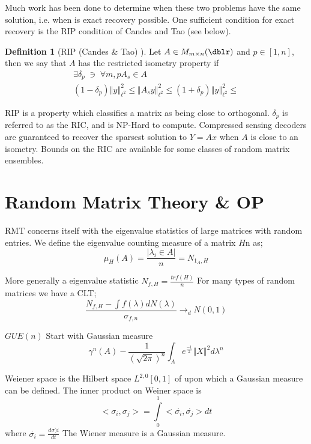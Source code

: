 \documentclass[a4paper]{article}
\newcommand{\norm}[1]{\left\Vert#1\right\Vert}
\theoremstyle{plain}
\theoremstyle{definition}
\newtheorem{defn}{Definition}[section]
\theoremstyle{remark}
\newcommand{\st}{\; \ni \;}
\numberwithin{equation}{section}
\begin{document}
Much work has been done to determine when these two problems have the same solution, i.e. when is exact recovery possible. One  sufficient condition for exact recovery is the RIP condition of Candes and Tao (see below).

\begin{defn}[RIP (Candes \& Tao) ]
Let $A \in M_{m \times n}(\dblr)$ and $p \in [1,n]$, then we say that $A$ has the restricted isometry property if
\begin{eqnarray*}
  \exists \delta_p \st \forall m,p A_s \in A \\
  (1 - \delta_p) \norm{y}_{\ell^2}^2 \leq   \norm{A_s y}_{\ell^2}^2 \leq (1 + \delta_p) \norm{y}_{\ell^2}^2 \leq
\end{eqnarray*}
\end{defn}
RIP is a property which classifies a matrix as being close to orthogonal.  $\delta_p$ is referred to as the RIC, and is NP-Hard to compute.  Compressed sensing decoders are guaranteed to recover the sparsest solution to $Y = A x$ when $A$ is close to an isometry. Bounds on the RIC are available for some classes of random matrix ensembles.


\section{Random Matrix Theory \& OP}

RMT concerns itself with the eigenvalue statistics of large matrices with random entries. We define the eigenvalue counting measure of a matrix $H$n as;
\begin{equation*}
\mu_H (A) = \frac{| \lambda_i \in A |}{n} = N_{1_A, H}
\end{equation*}

More generally a eigenvalue statistic $N_{f,H}  = \frac{tr f(H)}{n}$
For many types of random matrices we have a CLT;
\begin{equation*}
\frac{N_{f,H}-\int f(\lambda) dN(\lambda)}{\sigma_{f,n}} \rightarrow_d N(0,1)
\end{equation*}

$GUE(n)$ Start with Gaussian measure
\begin{equation*}
\gamma^n(A) - \frac{1}{(\sqrt{2 \pi} )^n} \int_A e^ \frac{-1}{2} \norm{X}^2 d \lambda^n
\end{equation*}

Weiener space is the Hilbert space $L^{2,0}[0,1]$ of upon which a Gaussian measure can be defined. The inner product on Weiner space is
\begin{equation*}
<\sigma_i,\sigma_j> = \int\limits_{0}^{1} <\overset{\cdot}{\sigma_i},\overset{\cdot}{\sigma_j}> dt
\end{equation*}
where $\overset{\cdot}{\sigma_i} = \frac{d \sigma)i}{dt}$
The Wiener measure is a Gaussian measure.
\end{document}
